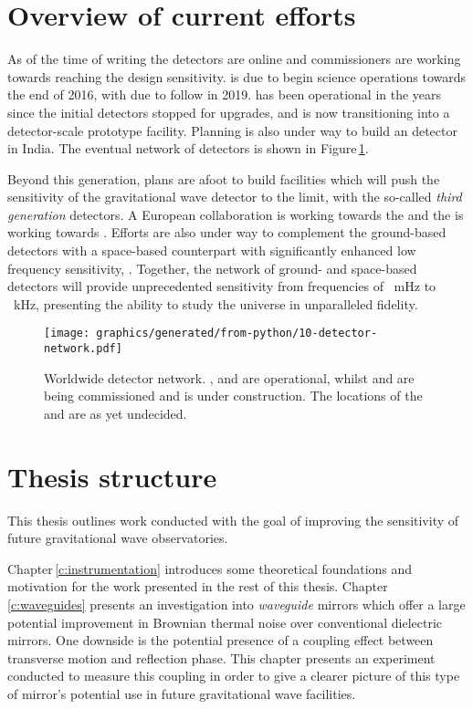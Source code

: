 \section{Overview of current efforts}
As of the time of writing the \ALIGO{} detectors are online and commissioners are working towards reaching the design sensitivity. \AVIRGO{} is due to begin science operations towards the end of 2016, with \KAGRA{} due to follow in 2019. \GEOHF{} has been operational in the years since the initial detectors stopped for upgrades, and is now transitioning into a detector-scale prototype facility. Planning is also under way to build an \ALIGO{} detector in India. The eventual network of detectors is shown in Figure\,\ref{fig:detector-network}.

Beyond this generation, plans are afoot to build facilities which will push the sensitivity of the gravitational wave detector to the limit, with the so-called \emph{third generation} detectors. A European collaboration is working towards the \emph{\ET{}} \cite{ET2011} and the \LSC{} is working towards \emph{\LIGOCE{}} \cite{Dwyer2015}. Efforts are also under way to complement the ground-based detectors with a space-based counterpart with significantly enhanced low frequency sensitivity, \emph{\ELISA{}} \cite{Amaro-Seoane2012}. Together, the network of ground- and space-based detectors will provide unprecedented sensitivity from frequencies of \SI{}{\milli\hertz} to \SI{}{\kilo\hertz}, presenting the ability to study the universe in unparalleled fidelity.

\begin{figure}
  \centering
  \texttt{[image: graphics/generated/from-python/10-detector-network.pdf]}
  \caption[Worldwide detector network]{\label{fig:detector-network}Worldwide detector network. \GEO{}, \LHO{} and \LLO{} are operational, whilst \VIRGO{} and \KAGRA{} are being commissioned and \INDIGO{} is under construction. The locations of the \ET{} and \LIGOCE{} are as yet undecided.}
\end{figure}

\section{Thesis structure}
This thesis outlines work conducted with the goal of improving the sensitivity of future gravitational wave observatories.

Chapter\,\ref{c:instrumentation} introduces some theoretical foundations and motivation for the work presented in the rest of this thesis. Chapter\,\ref{c:waveguides} presents an investigation into \emph{waveguide} mirrors which offer a large potential improvement in Brownian thermal noise over conventional dielectric mirrors. One downside is the potential presence of a coupling effect between transverse motion and reflection phase. This chapter presents an experiment conducted to measure this coupling in order to give a clearer picture of this type of mirror's potential use in future gravitational wave facilities.


